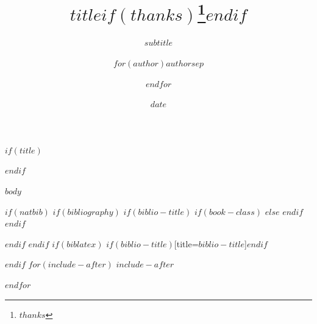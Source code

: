 \documentclass[$if(fontsize)$$fontsize$,$endif$$if(lang)$$babel-lang$,$endif$$if(papersize)$$papersize$,$endif$$for(classoption)$$classoption$$sep$,$endfor$]{article}
\title{$title$$if(thanks)$\thanks{$thanks$}$endif$}
\subtitle{$subtitle$}
\author{$for(author)$$author$$sep$ \and $endfor$}
\date{$date$}
\begin{document}
  

	$if(title)$
	\maketitle
	$endif$
	
	
		\thispagestyle{firststyle}




\vspace{2mm}
	


$body$




$if(natbib)$
$if(bibliography)$
$if(biblio-title)$
$if(book-class)$
\renewcommand\bibname{$biblio-title$}
$else$
\renewcommand\refname{$biblio-title$}
$endif$
$endif$


$endif$
$endif$
$if(biblatex)$
\printbibliography$if(biblio-title)$[title=$biblio-title$]$endif$




$endif$
$for(include-after)$
$include-after$

$endfor$
\end{document}
